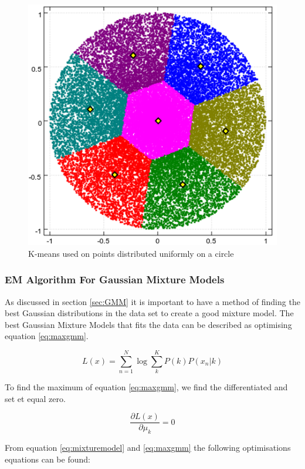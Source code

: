 \begin{figure}[H]
\centering
\includegraphics[scale=0.5]{billeder/CircleClusters}
\caption{K-means used on points distributed uniformly on a circle}
\label{fig:badkmeans}
\end{figure}

\subsubsection{EM Algorithm For Gaussian Mixture Models}
\label{sec:EMAlgorithm}

As discussed in section \ref{sec:GMM} it is important to have a method of finding the best Gaussian distributions in the data set to create a good mixture model. The best Gaussian Mixture Models that fits the data can be described as optimising equation \ref{eq:maxgmm}.

\begin{equation}
 L(x) = \sum\limits_{n=1}^N{\log{\sum\limits_{k}^K P(k) P(x_n|k) }}
\label{eq:maxgmm}
\end{equation}

To find the maximum of equation \ref{eq:maxgmm}, we find the differentiated and set et equal zero. 

 \begin{equation}
 \frac{\partial L(x)}{\partial{\mu_k}} = 0
\label{eq:partialzero}
\end{equation}

From equation \ref{eq:mixturemodel} and \ref{eq:maxgmm} the following optimisations equations can be found: 

